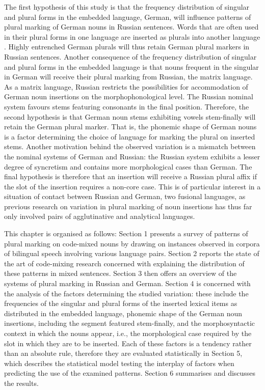 The first hypothesis of this study is that the frequency distribution of singular and plural forms in the embedded language, German, will influence patterns of plural marking of German nouns in Russian sentences. Words that are often used in their plural forms in one language are inserted as plurals into another language \citep{backus-two-1996, backus-evidence-1999, backus-units-2003}. Highly entrenched German plurals will thus retain German plural markers in Russian sentences. Another consequence of the frequency distribution of singular and plural forms in the embedded language is that nouns frequent in the singular in German will receive their plural marking from Russian, the matrix language. As a matrix language, Russian restricts the possibilities for accommodation of German noun insertions on the morphophonological level. The Russian nominal system favours stems featuring consonants in the final position. Therefore, the second hypothesis is that German noun stems exhibiting vowels stem-finally will retain the German plural marker. That is, the phonemic shape of German nouns is a factor determining the choice of language for marking the plural on inserted stems. Another motivation behind the observed variation is a mismatch between the nominal systems of German and Russian: the Russian system exhibits a lesser degree of syncretism and contains more morphological cases than German. The final hypothesis is therefore that an insertion will receive a Russian plural affix if the slot of the insertion requires a non-core case. This is of particular interest in a situation of contact between Russian and German, two fusional languages, as previous research on variation in plural marking of noun insertions has thus far only involved pairs of agglutinative and analytical languages.

This chapter is organised as follows: Section 1 presents a survey of patterns of plural marking on code-mixed nouns by drawing on instances observed in corpora of bilingual speech involving various language pairs. Section 2 reports the state of the art of code-mixing research concerned with explaining the distribution of these patterns in mixed sentences. Section 3 then offers an overview of the systems of plural marking in Russian and German. Section 4 is concerned with the analysis of the factors determining the studied variation: these include the frequencies of the singular and plural forms of the inserted lexical items as distributed in the embedded language, phonemic shape of the German noun insertions, including the segment featured stem-finally, and the morphosyntactic context in which the nouns appear, i.e., the morphological case required by the slot in which they are to be inserted. Each of these factors is a tendency rather than an absolute rule, therefore they are evaluated statistically in Section 5, which describes the statistical model testing the interplay of factors when predicting the use of the examined patterns. Section 6 summarises and discusses the results.

